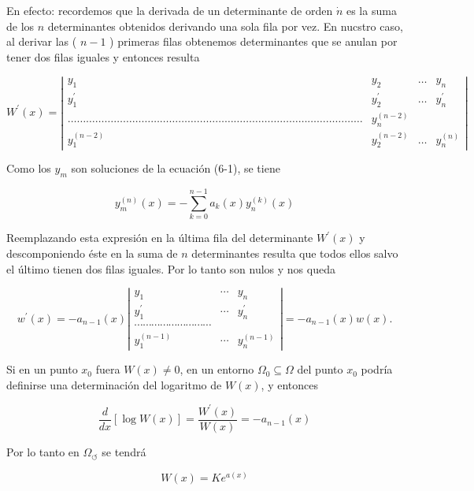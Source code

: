\documentclass[10pt]{article}
\theoremstyle{plain}
\theoremstyle{definition}
\theoremstyle{remark}
\begin{document}
En efecto: recordemos que la derivada de un determinante de orden $\dot{n}$ es la suma de los $n$ determinantes obtenidos derivando una sola fila por vez. En nucstro caso, al derivar las ( $n-1$ ) primeras filas obtenemos determinantes que se anulan por tener dos filas iguales y entonces resulta

$$
W^{\prime}(x)=\left|\begin{array}{cccc}
y_{1} & y_{2} & \ldots & y_{n} \\
y_{1}^{\prime} & y_{2}^{\prime} & \ldots & y_{n}^{\prime} \\
\ldots \ldots \ldots \ldots \ldots \ldots \ldots \ldots \ldots \ldots \ldots \ldots \ldots \ldots \ldots \ldots \ldots \ldots \ldots \ldots \ldots \ldots \ldots \ldots \ldots \ldots \ldots \ldots \ldots \ldots \ldots \ldots & y_{n}^{(n-2)} \\
y_{1}^{(n-2)} & y_{2}^{(n-2)} & \ldots & y_{n}^{(n)}
\end{array}\right|
$$

Como los $y_{m}$ son soluciones de la ecuación (6-1), se tiene

$$
y_{m}^{(n)}(x)=-\sum_{k=0}^{n-1} a_{k}(x) y_{n}^{(k)}(x)
$$

Reemplazando esta expresión en la última fila del determinante $W^{\prime}(x)$ y descomponiendo éste en la suma de $n$ determinantes resulta que todos ellos salvo el último tienen dos filas iguales. Por lo tanto son nulos y nos queda

$$
w^{\prime}(x)=-a_{n-1}(x)\left|\begin{array}{ccc}
y_{1} & \cdots & y_{n} \\
y_{1}^{\prime} & \cdots & y_{n}^{\prime} \\
\cdots \cdots \cdots \cdots \cdots \cdots \cdots \cdots \cdots \\
y_{1}^{(n-1)} & \cdots & y_{n}^{(n-1)}
\end{array}\right|=-a_{n-1}(x) w(x) .
$$

Si en un punto $x_{0}$ fuera $W(x) \neq 0$, en un entorno $\Omega_{0} \subseteq \Omega$ del punto $x_{0}$ podría definirse una determinación del logaritmo de $W(x)$, y entonces

$$
\frac{d}{d x}[\log W(x)]=\frac{W^{\prime}(x)}{W(x)}=-a_{n-1}(x)
$$

Por lo tanto en $\Omega_{\circlearrowleft}$ se tendrá


\begin{equation*}
W(x)=K e^{a(x)} \tag{6-6}
\end{equation*}
\end{document}
